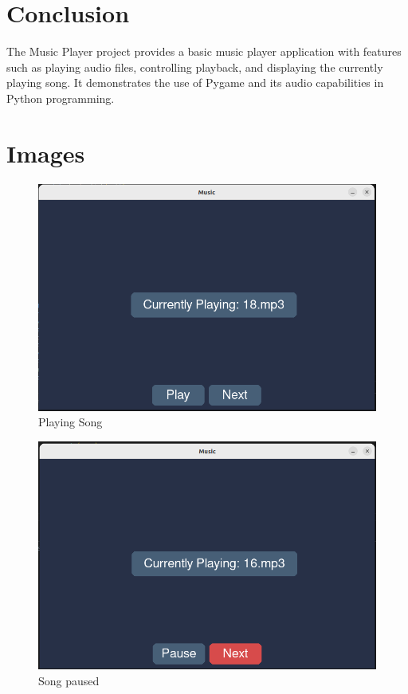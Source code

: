\documentclass[journal,12pt,twocolumn]{IEEEtran}
\begin{document}
\section{Conclusion}
The Music Player project provides a basic music player application with features such as playing audio files, controlling playback, and displaying the currently playing song. It demonstrates the use of Pygame and its audio capabilities in Python programming.


\section{Images}
    \begin{figure}[h]
        \includegraphics[width=\columnwidth]{figs/img1.png}
        \caption{Playing Song}
        \label{output1}
    \end{figure}

    \begin{figure}[h]
        \includegraphics[width=\columnwidth]{figs/img2.png}
        \caption{Song paused}
        \label{output2}
    \end{figure}
\end{document}
